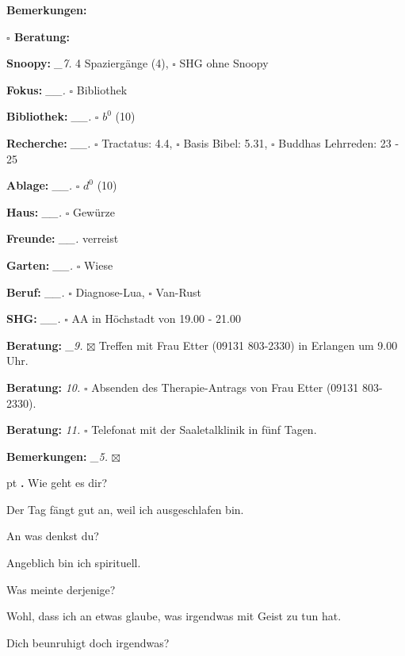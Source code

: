 \documentclass[10pt,a4paper]{article}
\newcounter{notec}
\newcommand\notep[1]{%
  \stepcounter{notec}
  \vskip #1pt
  {\bf\arabic{notec}.}
}
\newcommand\prop[1] {{\color {alizarin} {\bf #1}}}             %
\newcommand\opti[1] {{\color {amethyst} {\bf #1}}}             %
\newcommand\mand[1] {{\color {burntorange} {\bf #1}}}          %
\newcommand\bottomspace{\vskip 4pt}
\newcommand\n[1] { {\sl #1.} \hskip 5pt }
\begin{document}
\begin{mdframed}[style=daystyle]
\begin{labeling}{{\mand {Bemerkungen:}}}
\begin{minipage}{0.75\textwidth}
\begin{labeling}{\prop {$\square$ {Beratung:}}}
      \end{labeling}
    \end{minipage}
    \bottomspace
  \item[{\mand {Snoopy:}}]        \n{\_7} 4 Spaziergänge (4), $\square$ SHG ohne Snoopy
  \item[{\mand {Fokus:}}]        \n{\_\_} $\square$ Bibliothek
  \item[{\mand {Bibliothek:}}]   \n{\_\_} $\square$ $b^{0}$ (10)
  \item[{\mand {Recherche:}}]    \n{\_\_} $\square$ Tractatus: 4.4, $\square$ Basis Bibel: 5.31,
      $\square$ Buddhas Lehrreden: 23 - 25
  \item[{\mand {Ablage:}}]       \n{\_\_} $\square$ $d^{0}$ (10)
  \item[{\mand {Haus:}}]         \n{\_\_} $\square$ Gewürze
  \item[{\mand {Freunde:}}]      \n{\_\_} verreist
  \item[{\mand {Garten:}}]       \n{\_\_} $\square$ Wiese
  \item[{\mand {Beruf:}}]        \n{\_\_} $\square$ Diagnose-Lua, $\square$ Van-Rust
  \item[{\mand {SHG:}}]          \n{\_\_} $\square$ AA in Höchstadt von 19.00 - 21.00
  \item[{\opti {Beratung:}}]      \n{\_9} $\boxtimes$ Treffen mit Frau Etter (09131 803-2330) in Erlangen um 9.00 Uhr.
  \item[{\opti {Beratung:}}]       \n{10} $\square$ Absenden des Therapie-Antrags von Frau Etter (09131 803-2330).
  \item[{\opti {Beratung:}}]       \n{11} $\square$ Telefonat mit der Saaletalklinik in fünf Tagen.
  \item[{\mand {Bemerkungen:}}]   \n{\_5} $\boxtimes$
  \end{labeling}
    
  \setcounter{notec}{0}
  
  \notep 4 Wie geht es dir?

  \vskip 2pt
  Der Tag fängt gut an, weil ich ausgeschlafen bin.

  \vskip 2pt
  An was denkst du?

  \vskip 2pt
  Angeblich bin ich spirituell.

  \vskip 2pt
  Was meinte derjenige?

  \vskip 2pt
  Wohl, dass ich an etwas glaube, was irgendwas mit Geist zu tun hat.

  \vskip 2pt
  Dich beunruhigt doch irgendwas?


\end{mdframed}
\end{document}
